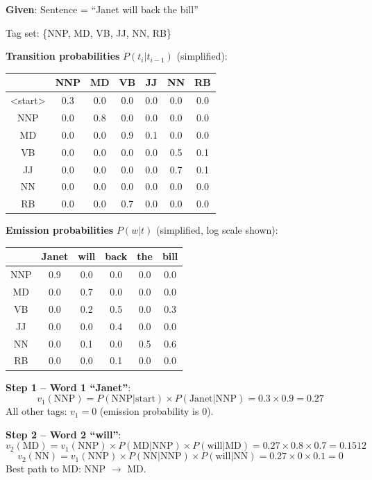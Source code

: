 \documentclass[11pt,a4paper]{article}
\begin{document}
\begin{tcolorbox}[colback=green!5!white,colframe=green!75!black,title=\textbf{Worked Example 24: Full Viterbi Walkthrough}]
\textbf{Given}: Sentence = ``Janet will back the bill''

Tag set: \{NNP, MD, VB, JJ, NN, RB\}

\textbf{Transition probabilities} $P(t_i | t_{i-1})$ (simplified):
\begin{center}
\begin{tabular}{|c|cccccc|}
\hline
 & NNP & MD & VB & JJ & NN & RB \\ \hline
<start> & 0.3 & 0.0 & 0.0 & 0.0 & 0.0 & 0.0 \\ \hline
NNP & 0.0 & 0.8 & 0.0 & 0.0 & 0.0 & 0.0 \\ \hline
MD & 0.0 & 0.0 & 0.9 & 0.1 & 0.0 & 0.0 \\ \hline
VB & 0.0 & 0.0 & 0.0 & 0.0 & 0.5 & 0.1 \\ \hline
JJ & 0.0 & 0.0 & 0.0 & 0.0 & 0.7 & 0.1 \\ \hline
NN & 0.0 & 0.0 & 0.0 & 0.0 & 0.0 & 0.0 \\ \hline
RB & 0.0 & 0.0 & 0.7 & 0.0 & 0.0 & 0.0 \\ \hline
\end{tabular}
\end{center}

\textbf{Emission probabilities} $P(w | t)$ (simplified, log scale shown):
\begin{center}
\begin{tabular}{|c|ccccc|}
\hline
 & Janet & will & back & the & bill \\ \hline
NNP & 0.9 & 0.0 & 0.0 & 0.0 & 0.0 \\ \hline
MD & 0.0 & 0.7 & 0.0 & 0.0 & 0.0 \\ \hline
VB & 0.0 & 0.2 & 0.5 & 0.0 & 0.3 \\ \hline
JJ & 0.0 & 0.0 & 0.4 & 0.0 & 0.0 \\ \hline
NN & 0.0 & 0.1 & 0.0 & 0.5 & 0.6 \\ \hline
RB & 0.0 & 0.0 & 0.1 & 0.0 & 0.0 \\ \hline
\end{tabular}
\end{center}

\textbf{Step 1 -- Word 1 ``Janet''}:
\[
v_1(\text{NNP}) = P(\text{NNP}|\text{start}) \times P(\text{Janet}|\text{NNP}) = 0.3 \times 0.9 = 0.27
\]
All other tags: $v_1 = 0$ (emission probability is 0).

\textbf{Step 2 -- Word 2 ``will''}:
\[
v_2(\text{MD}) = v_1(\text{NNP}) \times P(\text{MD}|\text{NNP}) \times P(\text{will}|\text{MD}) = 0.27 \times 0.8 \times 0.7 = 0.1512
\]
\[
v_2(\text{NN}) = v_1(\text{NNP}) \times P(\text{NN}|\text{NNP}) \times P(\text{will}|\text{NN}) = 0.27 \times 0 \times 0.1 = 0
\]
Best path to MD: NNP $\to$ MD.


\end{tcolorbox}
\end{document}
